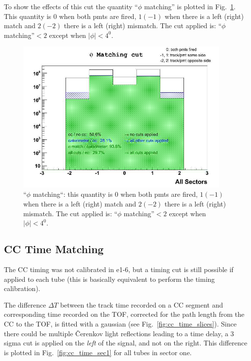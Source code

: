 To show the effects of this cut the quantity ``$\phi$ matching'' is plotted in
Fig.~\ref{fig:ccm_phi}. This quantity is $0$ when both pmts are fired, $1(-1)$ when
there is a left (right) match and $2(-2)$ there is a left (right) mismatch.
The cut applied is:  ``$\phi$ matching''$<2$ except when $|\phi|<4^0$.

\vspace{1.3cm}
\begin{figure}[h]
  \centering
		\includegraphics[width=0.95\textwidth]{img/phi_match_all_sectors.jpg}
		\caption{``$\phi$ matching``: this quantity is $0$ when both pmts are fired, $1(-1)$ when
there is a left (right) match and $2(-2)$ there is a left (right) mismatch.
The cut applied is:  ``$\phi$ matching''$<2$ except when $|\phi|<4^0$.}
 		\label{fig:ccm_phi}
\end{figure}

\clearpage\newpage

\subsection{CC Time Matching}
The CC timing was not calibrated in e1-6, but a timing cut is still possible if applied to each tube
(this is basically equivalent to perform the timing calibration).

The difference $\Delta T$ between the track time recorded on a CC segment and corresponding time recorded on the TOF,
corrected for the path length from the CC to the TOF, is fitted with a gaussian (see Fig.~\ref{fig:cc_time_slices}).
Since there could be multiple \v Cerenkov light reflections leading to a time delay,
a 3 sigma cut is applied on the {\it left} of the signal, and not on the right.
This difference is plotted in Fig.~\ref{fig:cc_time_sec1} for all tubes in sector one.

